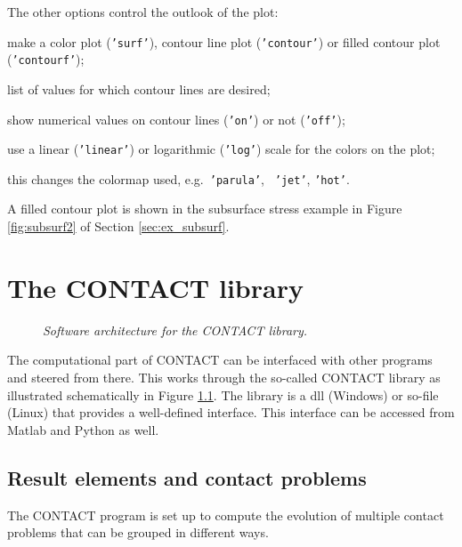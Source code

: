 \documentclass[12pt]{report}
\begin{document}
The other options control the outlook of the plot:
\begin{description}[leftmargin=6em,style=nextline]
\item[typplot] make a color plot ({\tt 'surf'}), contour line plot
        ({\tt 'contour'}) or filled contour plot ({\tt 'contourf'});
\item[cntrlvl] list of values for which contour lines are desired;
\item[clabel] show numerical values on contour lines ({\tt 'on'}) or
        not ({\tt 'off'});
\item[scale] use a linear ({\tt 'linear'}) or logarithmic ({\tt 'log'})
        scale for the colors on the plot;
\item[colormap] this changes the colormap used, e.g.\ {\tt 'parula'}, {\tt
        'jet'}, {\tt 'hot'}.
\end{description}
A filled contour plot is shown in the subsurface stress example in Figure
\ref{fig:subsurf2} of Section \ref{sec:ex_subsurf}.


\chapter{The CONTACT library}
\label{chp:contact_library}

\begin{figure}[bt]
\centering
{}
\caption{\em Software architecture for the CONTACT library.}
\label{fig:arch_lib}
\end{figure}

The computational part of CONTACT can be interfaced with other programs and
steered from there. This works through the so-called CONTACT library as
illustrated schematically in Figure \ref{fig:arch_lib}. The library is a
dll (Windows) or so-file (Linux) that provides a well-defined interface.
This interface can be accessed from Matlab and Python as well.

\section{Result elements and contact problems}

The CONTACT program is set up to compute the evolution of multiple contact
problems that can be grouped in different ways.
\end{document}
